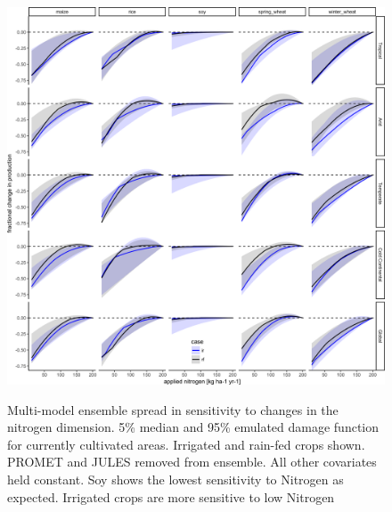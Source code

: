 \documentclass[10pt]{article}
\begin{document}
\begin{figure}[h!]
\includegraphics[width=\textwidth]{s_nitrogen.png}\\
\caption{Multi-model ensemble spread in sensitivity to changes in the nitrogen dimension. 5\% median and 95\% emulated damage function for currently cultivated areas. Irrigated and rain-fed crops shown. PROMET and JULES removed from ensemble. All other covariates held constant. Soy shows the lowest sensitivity to Nitrogen as expected. Irrigated crops are more sensitive to low Nitrogen}
\label{fig:nitrogen}
\end{figure}
\end{document}

